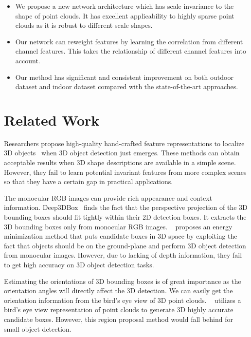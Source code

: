 \documentclass[letterpaper]{article} %
\begin{document}
\begin{itemize}
\item We propose a new network architecture which has scale invariance to the shape of point clouds. It has excellent applicability to highly sparse point clouds as it is robust to different scale shapes.
\item Our network can reweight features by learning the correlation from different channel features. This takes the relationship of different channel features into account.  
\item Our method has significant and consistent improvement on both outdoor dataset and indoor dataset compared with the state-of-the-art approaches.
\end{itemize}


\section{Related Work}
Researchers propose high-quality hand-crafted feature representations to localize 3D objects~\cite{dorai1997cosmos,johnson1999using,rusu2009fast} when 3D object detection just emerges. These methods can obtain acceptable results when 3D shape descriptions are available in a simple scene. However, they fail to learn potential invariant features from  more complex scenes so that they have a certain gap in practical applications.

The monocular RGB images can provide rich appearance and context information. Deep3DBox~\cite{mousavian20173d} finds the fact that the perspective projection of the 3D bounding boxes should fit tightly within their 2D detection boxes. It extracts the 3D bounding boxes only from monocular RGB images. ~\cite{chen2016monocular} proposes an energy minimization method that puts candidate boxes in 3D space by exploiting the fact that objects should be on the ground-plane and perform 3D object detection from monocular images. However, due to lacking of depth information, they fail to get high accuracy on 3D object detection tasks.

Estimating the orientations of 3D bounding boxes is of great importance as the orientation angles will directly affect the 3D detection. We can easily get the orientation information from the bird's eye view of 3D point clouds. ~\cite{chen2017multi} utilizes a bird's eye view representation of point clouds to generate 3D highly accurate candidate boxes. However, this region proposal method would fall behind for small object detection.
\end{document}
